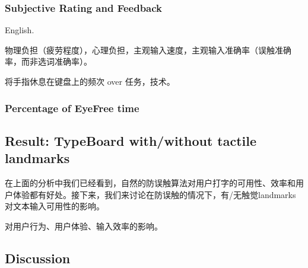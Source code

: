 \subsubsection{Subjective Rating and Feedback}

English.

物理负担（疲劳程度），心理负担，主观输入速度，主观输入准确率（误触准确率，而非选词准确率）。

将手指休息在键盘上的频次 over 任务，技术。

\subsubsection{Percentage of EyeFree time}

\subsection{Result: TypeBoard with/without tactile landmarks}

在上面的分析中我们已经看到，自然的防误触算法对用户打字的可用性、效率和用户体验都有好处。接下来，我们来讨论在防误触的情况下，有/无触觉landmarks对文本输入可用性的影响。

对用户行为、用户体验、输入效率的影响。

\subsection{Discussion}
